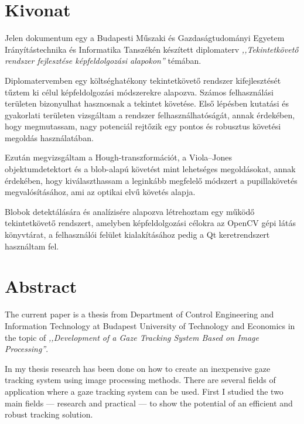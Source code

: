 \chapter*{Kivonat}

Jelen dokumentum egy a Budapesti Műszaki és Gazdaságtudományi Egyetem Irányítástechnika és Informatika Tanszékén készített diplomaterv \emph{,,Tekintetkövető rendszer fejlesztése képfeldolgozási alapokon''} témában. 

\bigskip

Diplomatervemben egy költséghatékony tekintetkövető rendszer kifejlesztését tűztem ki célul képfeldolgozási módszerekre alapozva. Számos felhasználási területen bizonyulhat hasznosnak a tekintet követése. Első lépésben kutatási és gyakorlati területen vizsgáltam a rendszer felhasználhatóságát, annak érdekében, hogy megmutassam, nagy potenciál rejtőzik egy pontos és robusztus követési megoldás használatában.

Ezután megvizsgáltam a Hough-transzformációt, a Viola--Jones objektumdetektort és a blob-alapú követést mint lehetséges megoldásokat, annak érdekében, hogy kiválaszthassam a leginkább megfelelő módszert a pupillakövetés megvalósításához, ami az optikai elvű követés alapja.

Blobok detektálására és analízisére alapozva létrehoztam egy működő tekintetkövető rendszert, amelyben képfeldolgozási célokra az OpenCV gépi látás könyvtárat, a felhasználói felület kialakításához pedig a Qt keretrendszert használtam fel.


\newpage

\chapter*{Abstract}

The current paper is a thesis from Department of Control Engineering and Information Technology at Budapest University of Technology and Economics in the topic of \emph{,,Development of a Gaze Tracking System Based on Image Processing''}. 

\bigskip

In my thesis research has been done on how to create an inexpensive gaze tracking system using image processing methods. There are several fields of application where a gaze tracking system can be used. First I studied the two main fields --- research and practical --- to show the potential of an efficient and robust tracking solution.

